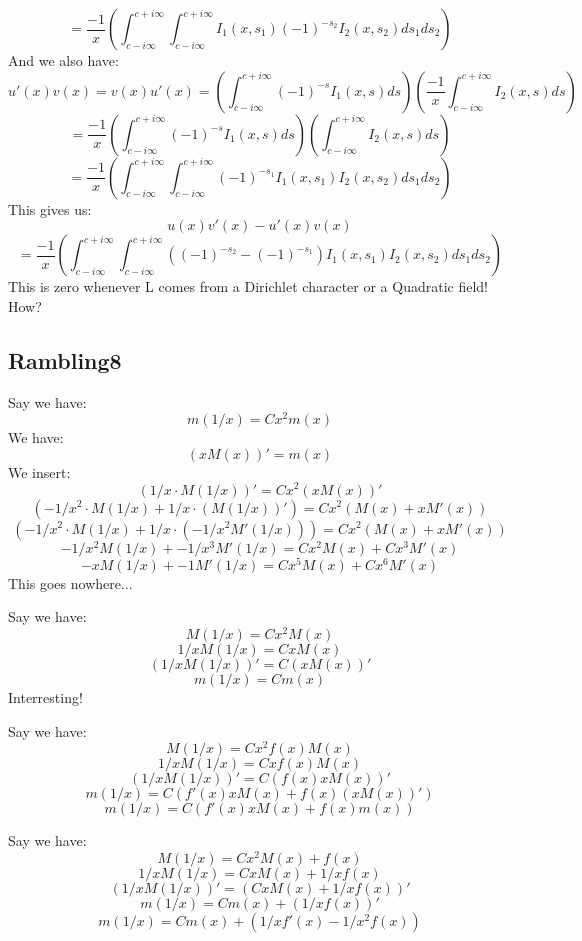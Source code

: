 \documentclass[a4paper]{amsart}
\begin{document}
$$ = \frac{-1}{x} \left(\int_{c - i\infty}^{c + i\infty}\int_{c - i\infty}^{c + i\infty}I_1(x, s_1)(-1)^{-s_2}I_2(x, s_2)ds_1ds_2\right)$$
And we also have:
$$u'(x)v(x) = v(x)u'(x) = \left(\int_{c - i\infty}^{c + i\infty}(-1)^{-s} I_1(x, s)ds\right)\left(\frac{-1}{x} \int_{c - i\infty}^{c + i\infty}I_2(x, s)ds\right)$$
$$ = \frac{-1}{x} \left(\int_{c - i\infty}^{c + i\infty}(-1)^{-s} I_1(x, s)ds\right)\left(\int_{c - i\infty}^{c + i\infty}I_2(x, s)ds\right)$$
$$ = \frac{-1}{x} \left(\int_{c - i\infty}^{c + i\infty}\int_{c - i\infty}^{c + i\infty}(-1)^{-s_1} I_1(x, s_1)I_2(x, s_2)ds_1ds_2\right)$$
This gives us: 
$$u(x)v'(x) - u'(x)v(x)$$
$$ = \frac{-1}{x} \left(\int_{c - i\infty}^{c + i\infty}\int_{c - i\infty}^{c + i\infty}\left((-1)^{-s_2} - (-1)^{-s_1}\right)I_1(x, s_1)I_2(x, s_2)ds_1ds_2\right)$$
This is zero whenever L comes from a Dirichlet character or a Quadratic field! How?

\subsection{Rambling8}


Say we have: 
$$m(1/x) = Cx^2m(x)$$
We have:
$$(xM(x))' = m(x)$$
We insert:
$$(1/x \cdot M(1/x))' = Cx^2(xM(x))'$$
$$(-1/x^2 \cdot M(1/x) + 1/x \cdot (M(1/x))') = Cx^2(M(x) + xM'(x))$$
$$(-1/x^2 \cdot M(1/x) + 1/x \cdot (-1/x^2 M'(1/x))) = Cx^2(M(x) + xM'(x))$$
$$-1/x^2 M(1/x) + -1/x^3 M'(1/x) = Cx^2M(x) + Cx^3M'(x)$$
$$-x M(1/x) + -1 M'(1/x) = Cx^5M(x) + Cx^6M'(x)$$
This goes nowhere...

Say we have:
$$M(1/x) = Cx^2M(x)$$
$$1/xM(1/x) = CxM(x)$$
$$(1/xM(1/x))' = C(xM(x))'$$
$$m(1/x) = Cm(x)$$
Interresting!

Say we have:
$$M(1/x) = Cx^2f(x)M(x)$$
$$1/xM(1/x) = Cxf(x)M(x)$$
$$(1/xM(1/x))' = C(f(x)xM(x))'$$
$$m(1/x) = C(f'(x)xM(x) + f(x)(xM(x))')$$
$$m(1/x) = C(f'(x)xM(x) + f(x)m(x))$$

Say we have:
$$M(1/x) = Cx^2M(x) + f(x)$$
$$1/xM(1/x) = CxM(x) + 1/xf(x)$$
$$(1/xM(1/x))' = (CxM(x) + 1/xf(x))'$$
$$m(1/x) = Cm(x) + (1/xf(x))'$$
$$m(1/x) = Cm(x) + (1/xf'(x) - 1/x^2f(x))$$
\end{document}
